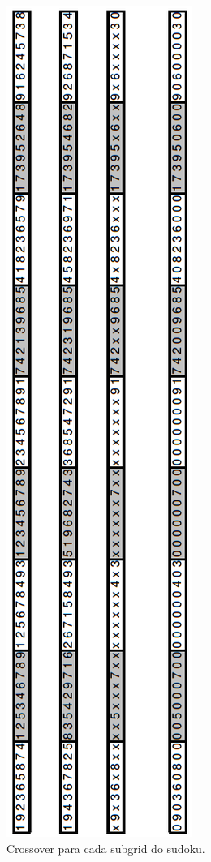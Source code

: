 \documentclass[twoside]{article}
\begin{document}
\begin{multicols}{2}
\begin{figure}[H]
\label{fig:cross_sud}
  \caption{Crossover para cada subgrid do sudoku.}
  \centering
    \includegraphics[scale = 0.6]{crossover_sudoku.png}
\end{figure}


\end{multicols}
\end{document}
